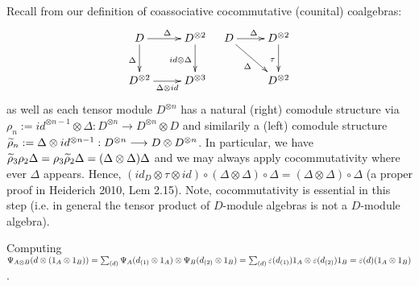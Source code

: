 Recall from our definition of coassociative cocommutative (counital) coalgebras:
$$
\bao{cc}
\xymatrix{
D \ar[r]^{\Delta}\ar[d]_{\Delta}&D^{\otimes2}\ar[d]_{id\otimes \Delta}\\
D^{\otimes2} \ar[r]_{\Delta\otimes id}&D^{\otimes3}\\
} &
\xymatrix{
D \ar[r]^\Delta\ar[rd]_{\Delta}&D^{\otimes2}\ar[d]_\tau\\
&D^{\otimes2}\\}
\ea$$
as well as each tensor module $D^{\otimes n}$ has a natural (right) comodule structure via $\rho_n := id^{\otimes n - 1} \otimes \Delta : D^{\otimes n} \longrightarrow D^{\otimes n} \otimes D$ and similarily a (left) comodule structure $\widetilde{\rho}_n := \Delta \otimes id^{\otimes n - 1} : D^{\otimes n} \longrightarrow D \otimes D^{\otimes n}$. In particular, we have $\widetilde{\rho}_3 \rho_2 \Delta = \rho_3 \widetilde{\rho}_2 \Delta = (\Delta \otimes \Delta)\Delta$ and we may always apply cocommutativity where ever $\Delta$ appears. Hence, $(id_D \otimes \tau \otimes id) \circ (\Delta \otimes \Delta) \circ \Delta = (\Delta \otimes \Delta) \circ \Delta$ (a proper proof in Heiderich 2010, Lem 2.15). Note, cocommutativity is essential in this step (i.e. in general the tensor product of $D$-module algebras is not a $D$-module algebra).
\item Computing $\Psi_{A\otimes B}(d \otimes (1_A\otimes 1_B)) = \sum_{(d)}\Psi_A(d_{(1)} \otimes 1_A) \otimes \Psi_B(d_{(2)} \otimes 1_B) = \sum_{(d)}\varepsilon(d_{(1)}) 1_A \otimes \varepsilon(d_{(2)}) 1_B = \varepsilon(d) (1_A \otimes 1_B)$.
\en
